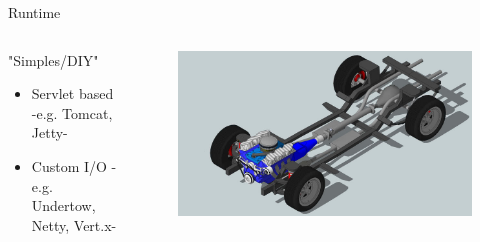 \documentclass[aspectratio=169]{beamer}
\begin{document}
\begin{frame}{Runtime}

\begin{columns}
\begin{column}{0.5\textwidth}
"Simples/DIY"
\begin{itemize}
\item Servlet based -e.g. Tomcat, Jetty-
\item Custom I/O -e.g. Undertow, Netty, Vert.x-
\end{itemize}
\end{column}
\begin{column}{0.5\textwidth}  %
\begin{figure}
	\centering
	\includegraphics[width=0.9\linewidth]{Images/chassis}
\end{figure}
\end{column}
\end{columns}

\end{frame}
\end{document}
